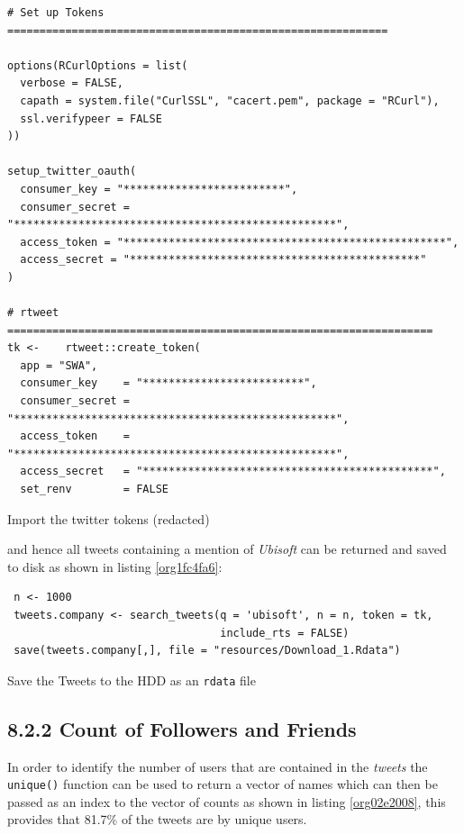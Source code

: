 \documentclass[11pt]{article}
\begin{document}
\begin{listing}[htbp]
\begin{verbatim}
# Set up Tokens ===========================================================

options(RCurlOptions = list(
  verbose = FALSE,
  capath = system.file("CurlSSL", "cacert.pem", package = "RCurl"),
  ssl.verifypeer = FALSE
))

setup_twitter_oauth(
  consumer_key = "*************************",
  consumer_secret = "**************************************************",
  access_token = "**************************************************",
  access_secret = "*********************************************"
)

# rtweet ==================================================================
tk <-    rtweet::create_token(
  app = "SWA",
  consumer_key    = "*************************",
  consumer_secret = "**************************************************",
  access_token    = "**************************************************",
  access_secret   = "*********************************************",
  set_renv        = FALSE
\end{verbatim}
\caption{\label{orgb3850f7}Import the twitter tokens (redacted)}
\end{listing}

and hence all tweets containing a mention of \emph{Ubisoft} can be returned and saved to disk as shown in listing \ref{org1fc4fa6}:

\begin{listing}[htbp]
\begin{verbatim}
 n <- 1000
 tweets.company <- search_tweets(q = 'ubisoft', n = n, token = tk,
                                 include_rts = FALSE)
 save(tweets.company[,], file = "resources/Download_1.Rdata")
\end{verbatim}
\caption{\label{org1fc4fa6}Save the Tweets to the HDD as an \texttt{rdata} file}
\end{listing}

\subsection{8.2.2 Count of Followers and Friends}
\label{sec:org417d722}
In order to identify the number of users that are contained in the \emph{tweets} the
\texttt{unique()} function can be used to return a vector of names which can then be passed as an index to the vector of counts as shown in listing \ref{org02e2008}, this provides that 81.7\% of the tweets are by unique users.
\end{document}
